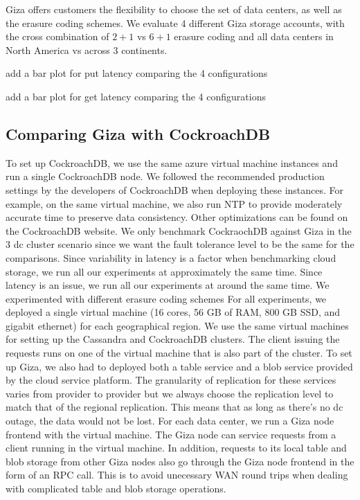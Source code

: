 Giza offers customers the flexibility to choose the set of data centers, as well as the erasure coding schemes. We evaluate 4 different Giza storage accounts, with the cross combination of $2+1$ vs $6+1$ erasure coding and all data centers in North America vs across 3 continents.

add a bar plot for put latency comparing the 4 configurations

add a bar plot for get latency comparing the 4 configurations

\subsection{Comparing Giza with CockroachDB}

To set up CockroachDB, we use the same azure virtual machine instances and run a single CockroachDB node. We followed the recommended production settings by the developers of CockroachDB when deploying these instances. For example, on the same virtual machine, we also run NTP to provide moderately accurate time to preserve data consistency. Other optimizations can be found on the CockroachDB website. We only benchmark CockraochDB against Giza in the 3 dc cluster scenario since we want the fault tolerance level to be the same for the comparisons.
Since variability in latency is a factor when benchmarking cloud storage, we run all our experiments at approximately the same time.
Since latency is an issue, we run all our experiments at around the same time.
We experimented with different erasure coding schemes
For all experiments, we deployed a single virtual machine (16 cores, 56 GB of RAM, 800 GB SSD, and gigabit ethernet) for each geographical region. We use the same virtual machines for setting up the Cassandra and CockroachDB clusters. The client issuing the requests runs on one of the virtual machine that is also part of the cluster. 
To set up Giza, we also had to deployed both a table service and a blob service provided by the cloud service platform. The granularity of replication for these services varies from provider to provider but we always choose the replication level to match that of the regional replication. This means that as long as there’s no dc outage, the data would not be lost. For each data center, we run a Giza node frontend with the virtual machine. The Giza node can service requests from a client running in the virtual machine. In addition, requests to its local table and blob storage from other Giza nodes also go through the Giza node frontend in the form of an RPC call. This is to avoid unecessary WAN round trips when dealing with complicated table and blob storage operations. 

